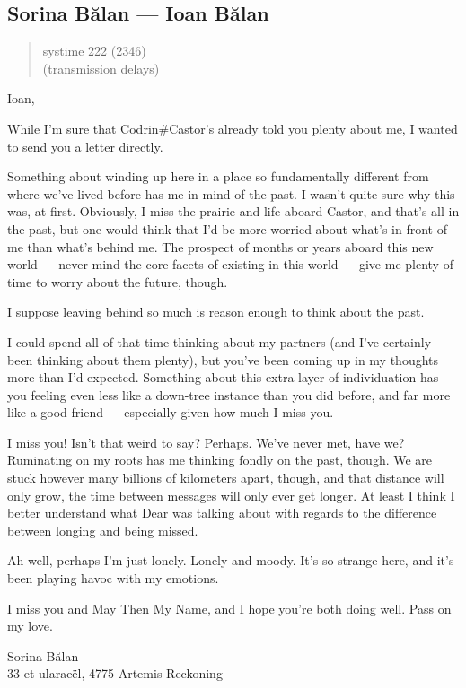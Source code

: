 \hypertarget{sorina-bux103lan-ioan-bux103lan}{%
\subsection{Sorina Bălan — Ioan Bălan}\label{sorina-bux103lan-ioan-bux103lan}}

\begin{quote}
systime 222 (2346)\\
(transmission delays)
\end{quote}

Ioan,

While I'm sure that Codrin\#Castor's already told you plenty about me, I wanted to send you a letter directly.

Something about winding up here in a place so fundamentally different from where we've lived before has me in mind of the past. I wasn't quite sure why this was, at first. Obviously, I miss the prairie and life aboard Castor, and that's all in the past, but one would think that I'd be more worried about what's in front of me than what's behind me. The prospect of months or years aboard this new world — never mind the core facets of existing in this world — give me plenty of time to worry about the future, though.

I suppose leaving behind so much is reason enough to think about the past.

I could spend all of that time thinking about my partners (and I've certainly been thinking about them plenty), but you've been coming up in my thoughts more than I'd expected. Something about this extra layer of individuation has you feeling even less like a down-tree instance than you did before, and far more like a good friend — especially given how much I miss you.

I miss you! Isn't that weird to say? Perhaps. We've never met, have we? Ruminating on my roots has me thinking fondly on the past, though. We are stuck however many billions of kilometers apart, though, and that distance will only grow, the time between messages will only ever get longer. At least I think I better understand what Dear was talking about with regards to the difference between longing and being missed.

Ah well, perhaps I'm just lonely. Lonely and moody. It's so strange here, and it's been playing havoc with my emotions.

I miss you and May Then My Name, and I hope you're both doing well. Pass on my love.

Sorina Bălan\\
33 et-ularaeël, 4775 Artemis Reckoning
